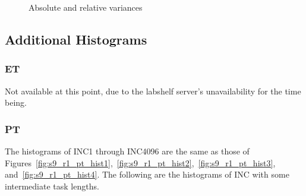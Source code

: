 \begin{figure}[htp!]
{		\label{fig:overall_re}
	}
	\caption{Absolute and relative variances~\label{fig:cv_inc}}
\end{figure}

\pagebreak
\newpage

\subsection{Additional Histograms}

\subsubsection{ET}
Not available at this point, due to the labshelf server's unavailability for the time being.

\subsubsection{PT}
The histograms of INC1 through INC4096 are 
the same as those of Figures~\ref{fig:s9_r1_pt_hist1},~\ref{fig:s9_r1_pt_hist2},~\ref{fig:s9_r1_pt_hist3}, and~\ref{fig:s9_r1_pt_hist4}. 
The following are the histograms of INC with some intermediate task lengths.

